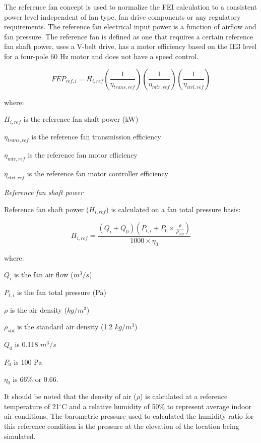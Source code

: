 The reference fan concept is used to normalize the FEI calculation to a consistent power level independent of fan type, fan drive components or any regulatory requirements. The reference fan electrical input power is a function of airflow and fan pressure. The reference fan is defined as one that requires a certain reference fan shaft power, uses a V-belt drive, has a motor efficiency based on the IE3 level for a four-pole 60 Hz motor and does not have a speed control.

\begin{equation}
FEP_{ref,i}=H_{i,ref}(\frac{1}{\eta_{trans,ref}} )(\frac{1}{\eta_{mtr,ref}})(\frac{1}{\eta_{ctrl,ref}})
\label{eq:fep_calculation}
\end{equation}

where:

\(H_{i,ref}\) is the reference fan shaft power (kW)

\(\eta_{trans,ref}\) is the reference fan transmission efficiency

\(\eta_{mtr,ref}\) is the reference fan motor efficiency

\(\eta_{ctrl,ref}\) is the reference fan motor controller efficiency

\emph{Reference fan shaft power}

Reference fan shaft power (\(H_{i,ref}\)) is calculated on a fan total pressure basis:

\begin{equation}
H_{i,ref}=\frac{(Q_i + Q_0)(P_{t,i} + P_0 \times \frac{\rho}{\rho_{std}} )}{1000 \times \eta_0}
\label{eq:Href_calculation}
\end{equation}

where:

\(Q_i\) is the fan air flow (\(m^3/s\))

\(P_{t,i}\) is the fan total pressure (Pa)

\(\rho\) is the air density (\(kg/m^3\))

\(\rho_{std}\) is the standard air density (1.2 \(kg/m^3\))

\(Q_0\) is 0.118 \(m^3/s\)

\(P_0\) is 100 Pa

\(\eta_0\) is 66\% or 0.66.

It should be noted that the density of air (\(\rho\)) is calculated at a reference temperature of 21\(^{\circ}\)C and a relative humidity of 50\% to represent average indoor air conditions.  The barometric pressure used to calculated the humidity ratio for this reference condition is the pressure at the elevation of the location being simulated.

